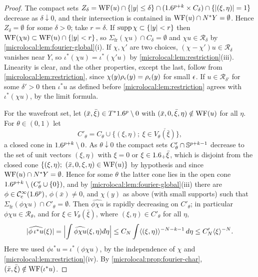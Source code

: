 \begin{proof}
  The compact sets
  $Z_\delta=\operatorname{WF}(u)\cap\{\lvert y\rvert\le\delta\}\cap(1.6^{p+k}\times C_\delta)\cap
  \{\lvert (\xi,\eta)\rvert=1\}$ decrease as $\delta\downarrow0$, and their
  intersection is contained in $\operatorname{WF}(u)\cap N^*Y=\emptyset$. Hence
  $Z_\delta=\emptyset$ for some $\delta>0$; take $r=\delta$. If $\operatorname{supp}
  \chi\subset\{\lvert y\rvert<r\}$ then $\operatorname{WF}(\chi u)\subset\operatorname{WF}(u)\cap\{\lvert y\rvert<r\}$, so
  $\Sigma_{\mathrm{fr}}(\chi u)\cap C_\delta=\emptyset$ and $\chi u\in\mathcal R_\delta$ by
  \cref{microlocal:lem:fourier-global}(i). If $\chi,\chi'$ are two choices,
  $(\chi-\chi')u\in\mathcal R_\delta$ vanishes near $Y$, so
  $\iota^*(\chi u)=\iota^*(\chi'u)$ by \cref{microlocal:lem:restriction}(iii).
  Linearity is clear, and the other properties, except the last, follow from
  \cref{microlocal:lem:restriction}, since $\chi(y)\rho_\epsilon(y)=\rho_\epsilon(y)$
  for small $\epsilon$. If $u\in\mathcal R_{\delta'}$ for some $\delta'>0$ then
  $\iota^*u$ as defined before \cref{microlocal:lem:restriction} agrees with
  $\iota^*(\chi u)$, by the limit formula.

  For the wavefront set, let $(\bar x,\bar\xi)\in T^*1.6^p\setminus0$ with $(\bar
  x,0,\bar\xi,\eta)\notin\operatorname{WF}(u)$ for all $\eta$. For $\theta\in(0,1)$ let
  \begin{equation*}
    C'_\theta=C_\theta\cup\{(\xi,\eta);\ \xi\in\overline{V_\theta(\bar\xi)}\},
  \end{equation*}
  a closed cone in $1.6^{p+k}\setminus0$. As $\theta\downarrow0$ the compact
  sets $C'_\theta\cap\mathbb{S}^{p+k-1}$ decrease to the set of unit vectors
  $(\xi,\eta)$ with $\xi=0$ or $\xi\in1.6_+\bar\xi$, which is disjoint from the
  closed cone $\{(\xi,\eta);\ (\bar x,0,\xi,\eta)\in\WF(u)\}$ by hypothesis
  and since $\operatorname{WF}(u)\cap N^*Y=\emptyset$. Hence for some $\theta$ the latter
  cone lies in the open cone $1.6^{p+k}\setminus(C'_\theta\cup\{0\})$, and by
  \cref{microlocal:lem:fourier-global}(iii) there are $\phi\in\mathcal{C}^\infty_{\mathrm{c}}(1.6^p)$,
  $\phi(\bar x)\ne0$, and $\chi(y)$ as above (with small supports) such that
  $\Sigma_{\mathrm{fr}}(\phi\chi u)\cap C'_\theta=\emptyset$. Then
  $\widehat{\phi\chi u}$ is rapidly decreasing on $C'_\theta$; in particular
  $\phi\chi u\in\mathcal R_\theta$, and for $\xi\in V_\theta(\bar\xi)$, where
  $(\xi,\eta)\in C'_\theta$ for all $\eta$,
  \begin{equation*}
    \abs{\widehat{\phi\,\iota^*u}(\xi)}=\Bigl|\int\widehat{\phi\chi u}(\xi,\eta)\,
    \dbar\eta\Bigr|\le C_N\int\ang{(\xi,\eta)}^{-N-k-1}\,d\eta\le C'_N\ang\xi^{-N}.
  \end{equation*}
  Here we used $\phi\iota^*u=\iota^*(\phi\chi u)$, by the independence of
  $\chi$ and \cref{microlocal:lem:restriction}(iv). By
  \cref{microlocal:prop:fourier-char}, $(\bar x,\bar\xi)\notin\operatorname{WF}(\iota^*u)$.
\end{proof}

